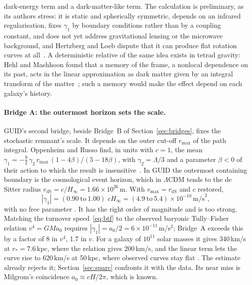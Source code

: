 dark-energy term and a dark-matter-like term. The calculation is preliminary, as its authors stress: it is static and spherically
symmetric, depends on an infrared regularisation, fixes $\gamma_1$ by boundary conditions rather than by a coupling constant, and does not
yet address gravitational lensing or the microwave background, and Hertzberg and Loeb dispute that it can produce flat rotation
curves at all~\cite{hertzberg2024}. A deterministic relative of the same idea exists in tetrad gravity: Hehl
and Mashhoon found that a memory of the frame, a nonlocal dependence on its past, acts in the linear approximation as dark matter given by
an integral transform of the matter~\cite{hehlmashhoon}; such a memory would make the effect depend on each galaxy's history.



\paragraph{Bridge A: the outermost horizon sets the scale.} GUID's second bridge, beside Bridge~B of Section~\ref{sec:bridges}, fixes
the stochastic remnant's scale. It depends on the outer
cut-off $r_{\max}$ of the path integral. Oppenheim and Russo find, in units with $c=1$, the mean
$\gamma_1=-\tfrac92\,\gamma_2\,r_{\max}\,(1-4\beta)/(5-18\beta)$, with $\gamma_2=\Lambda/3$ and a parameter $\beta<0$ of their action to which
the result is insensitive~\cite{oppenheimrusso}. In GUID the outermost containing boundary is the cosmological event horizon, which in
$\Lambda$CDM tends to the de Sitter radius $r_{\text{dS}}=c/H_\infty=1.66\times10^{26}$\,m. With $r_{\max}=r_{\text{dS}}$ and $c$ restored,
\begin{equation}\label{eq:bridgeA}
|\gamma_1|=(0.90\ \text{to}\ 1.00)\;cH_\infty=(4.9\ \text{to}\ 5.4)\times10^{-10}\,\text{m/s}^2,
\end{equation}
with no free parameter . It has the right order of magnitude and is too strong. Matching the turnover speed~\eqref{eq:btf} to the
observed baryonic Tully--Fisher relation $v^4=GMa_0$ requires $|\gamma_1|=a_0/2=6\times10^{-11}$\,m/s$^2$; Bridge~A exceeds this by a factor
of 8 in $v^4$, 1.7 in $v$. For a galaxy of $10^{11}$ solar masses it gives 340\,km/s at $r_*=7.6$\,kpc, where the relation gives 200\,km/s,
and the linear term lets the curve rise to 620\,km/s at 50\,kpc, where observed curves stay flat . The estimate already rejects
it; Section~\ref{sec:sparc} confronts it with the data. Its near miss is Milgrom's coincidence $a_0\approx cH/2\pi$, which is known.

